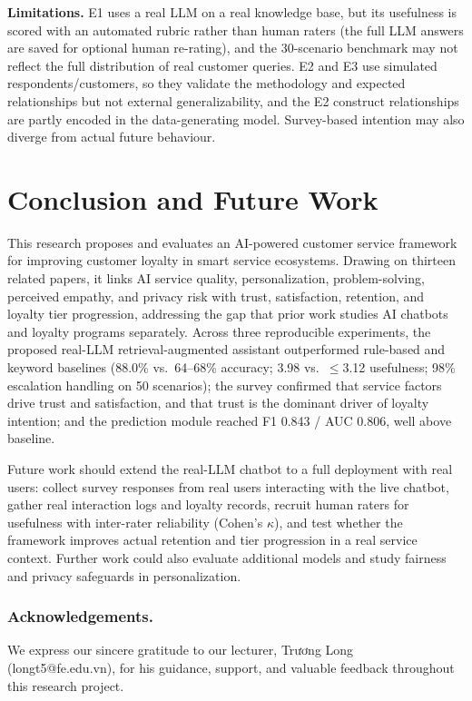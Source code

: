 \documentclass[runningheads]{llncs}
\begin{document}
\noindent\textbf{Limitations.} E1 uses a real LLM on a real knowledge base, but its usefulness is scored with an automated rubric rather than human raters (the full LLM answers are saved for optional human re-rating), and the 30-scenario benchmark may not reflect the full distribution of real customer queries. E2 and E3 use simulated respondents/customers, so they validate the methodology and expected relationships but not external generalizability, and the E2 construct relationships are partly encoded in the data-generating model. Survey-based intention may also diverge from actual future behaviour.

\section{Conclusion and Future Work}

This research proposes and evaluates an AI-powered customer service framework for improving customer loyalty in smart service ecosystems. Drawing on thirteen related papers, it links AI service quality, personalization, problem-solving, perceived empathy, and privacy risk with trust, satisfaction, retention, and loyalty tier progression, addressing the gap that prior work studies AI chatbots and loyalty programs separately. Across three reproducible experiments, the proposed real-LLM retrieval-augmented assistant outperformed rule-based and keyword baselines (88.0\% vs.\ 64--68\% accuracy; 3.98 vs.\ $\le$3.12 usefulness; 98\% escalation handling on 50 scenarios); the survey confirmed that service factors drive trust and satisfaction, and that trust is the dominant driver of loyalty intention; and the prediction module reached F1 0.843 / AUC 0.806, well above baseline.

Future work should extend the real-LLM chatbot to a full deployment with real users: collect survey responses from real users interacting with the live chatbot, gather real interaction logs and loyalty records, recruit human raters for usefulness with inter-rater reliability (Cohen's $\kappa$), and test whether the framework improves actual retention and tier progression in a real service context. Further work could also evaluate additional models and study fairness and privacy safeguards in personalization.

\subsubsection*{Acknowledgements.} We express our sincere gratitude to our lecturer, Trương Long (longt5@fe.edu.vn), for his guidance, support, and valuable feedback throughout this research project.
\end{document}
